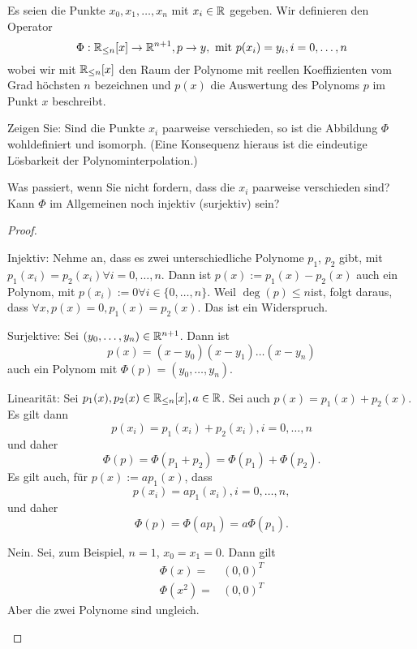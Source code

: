 \begin{Problem}
	Es seien die Punkte $x_0, x_1, \dots, x_n$ mit $x_i \in \mathbb{R}$ gegeben. Wir definieren den Operator
	\[
		\Phi:\mathbb{R}_{\le n}[x]\to \mathbb{R}^{n+1}, p\to y, \text{ mit }p(x_i)=y_i, i=0,\dots,n
	\] 
	wobei wir mit $\mathbb{R}_{\le n}[x]$ den Raum der Polynome mit reellen Koeffizienten vom Grad höchsten $n$ bezeichnen und $p(x)$ die Auswertung des Polynoms $p$ im Punkt $x$ beschreibt.
	\begin{parts}
		\item  Zeigen Sie: Sind die Punkte $x_i$ paarweise verschieden, so ist die Abbildung $\Phi$ wohldefiniert und isomorph. (Eine Konsequenz hieraus ist die eindeutige Lösbarkeit der Polynominterpolation.)
		\item Was passiert, wenn Sie nicht fordern, dass die $x_i$ paarweise verschieden sind? Kann $\Phi$ im Allgemeinen noch injektiv (surjektiv) sein?
	\end{parts}
\end{Problem}
\begin{proof}
	\begin{parts}
\item Injektiv: Nehme an, dass es zwei unterschiedliche Polynome $p_1$, $p_2$ gibt, mit $p_1(x_i)=p_2(x_i)\forall i=0,\dots,n$. Dann ist $p(x):=p_1(x)-p_2(x)$ auch ein Polynom, mit $p(x_i):=0\forall i\in \{0,\dots,n\}$. Weil  $ \deg(p)\le n$ist, folgt daraus, dass $\forall x,p(x)=0, p_1(x)=p_2(x)$. Das ist ein Widerspruch.

	Surjektive: Sei $(y_0,\dots,y_n)\in \mathbb{R}^{n+1}$. Dann ist
	\[
	p(x)=(x-y_0)(x-y_1)\dots(x-y_n)
	\]
	auch ein Polynom mit $\Phi(p)=(y_0,\dots,y_n)$.

	Linearität: Sei $p_1(x),p_2(x)\in \mathbb{R}_{\le n}[x], a\in \mathbb{R}$. Sei auch $p(x)=p_1(x)+p_2(x)$. Es gilt dann
	\[
	p(x_i)=p_1(x_i)+p_2(x_i),i=0,\dots,n\] und daher
	\[
	\Phi(p)=\Phi(p_1+p_2)=\Phi(p_1)+\Phi(p_2)
	.\] 
	Es gilt auch, f\"{u}r $p(x):=ap_1(x)$, dass
	\[
	p(x_i)=ap_1(x_i), i=0,\dots,n
	,\]
	und daher
	\[
	\Phi(p)=\Phi(ap_1)=a\Phi(p_1)
	.\] 
\item Nein. Sei, zum Beispiel, $n=1$, $x_0=x_1=0$. Dann gilt
	\begin{align*}
		\Phi(x)=&(0,0)^T\\
		\Phi(x^2)=&(0,0)^T
	\end{align*}
	Aber die zwei Polynome sind ungleich.
	\end{parts}
\end{proof}

